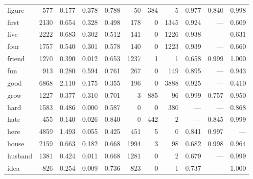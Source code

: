 \begin{landscape}
\begin{longtable}[c]{ l | r r c c | r r r | r r r }
  figure     & 577   & 0.177                   & 0.378           & 0.788      & 50        & 384         & 5            & 0.977     & 0.840       & 0.998\\
  first      & 2130  & 0.654                   & 0.328           & 0.498      & 178       & 0           & 1345         & 0.924     & —           & 0.609\\
  five       & 2222  & 0.683                   & 0.302           & 0.512      & 141       & 0           & 1226         & 0.938     & —           & 0.631\\
  four       & 1757  & 0.540                   & 0.301           & 0.578      & 140       & 0           & 1223         & 0.939     & —           & 0.660\\
  friend     & 1270  & 0.390                   & 0.012           & 0.653      & 1237      & 1           & 1            & 0.658     & 0.999       & 1.000\\
  fun        & 913   & 0.280                   & 0.594           & 0.761      & 267       & 0           & 149          & 0.895     & —           & 0.943\\
  good       & 6868  & 2.110                   & 0.175           & 0.355      & 196       & 0           & 3888         & 0.925     & —           & 0.410\\
  grow       & 1227  & 0.377                   & 0.310           & 0.701      & 3         & 885         & 96           & 0.999     & 0.757       & 0.950\\
  hard       & 1583  & 0.486                   & 0.000           & 0.587      & 0         & 0           & 380          & —         & —           & 0.868\\
  hate       & 455   & 0.140                   & 0.026           & 0.840      & 0         & 442         & 2            & —         & 0.845       & 0.999\\
  here       & 4859  & 1.493                   & 0.055           & 0.425      & 451       & 5           & 0            & 0.841     & 0.997       & —\\
  house      & 2159  & 0.663                   & 0.182           & 0.668      & 1994      & 3           & 98           & 0.682     & 0.998       & 0.964\\
  husband    & 1381  & 0.424                   & 0.011           & 0.668      & 1281      & 0           & 2            & 0.679     & —           & 0.999\\
  idea       & 826   & 0.254                   & 0.009           & 0.736      & 823       & 0           & 1            & 0.737     & —           & 1.000\\

\end{longtable}
\end{landscape}
